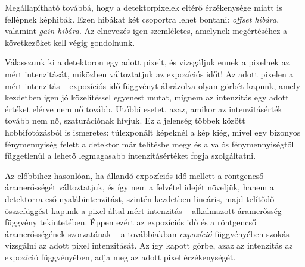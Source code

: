 \documentclass[a4paper,12pt]{article}
\begin{document}
Megállapítható továbbá, hogy a detektorpixelek eltérő érzékenysége miatt is fellépnek képhibák. Ezen hibákat két csoportra lehet bontani: \emph{offset hibára}, valamint \emph{gain hibára}. Az elnevezés igen szemléletes, amelynek megértéséhez a következőket kell végig gondolnunk. 

Válasszunk ki a detektoron egy adott pixelt, és vizsgáljuk ennek a pixelnek az mért intenzitását, miközben változtatjuk az expozíciós időt! Az adott pixelen a mért intenzitás -- expozíciós idő függvényt ábrázolva olyan görbét kapunk, amely kezdetben igen jó közelítéssel egyenest mutat, mígnem az intenzitás egy adott értéket elérve nem nő tovább. Utóbbi esetet, azaz, amikor az intenzitásérték tovább nem nő, szaturációnak hívjuk. Ez a jelenség többek között hobbifotózásból is ismeretes: túlexponált képeknél a kép kiég, mivel egy bizonyos fénymennyiség felett a detektor már telítésbe megy és a valós fénymennyiségtől függetlenül a lehető legmagasabb intenzitásértéket fogja szolgáltatni.

Az előbbihez hasonlóan, ha állandó expozíciós idő mellett a röntgencső áramerősségét változtatjuk, és így nem a felvétel idejét növeljük, hanem a detektorra eső nyalábintenzitást, szintén kezdetben lineáris, majd telítődő összefüggést kapunk a pixel által mért intenzitás -- alkalmazott áramerősség függvény tekintetében. Éppen ezért az expozíciós idő és a röntgencső áramerősségének szorzatának -- a továbbiakban \emph{expozíció} függvényében szokás vizsgálni az adott pixel intenzitását. Az így kapott görbe, azaz az intenzitás az expozíció függvényében, adja meg az adott pixel érzékenységét.
\end{document}
